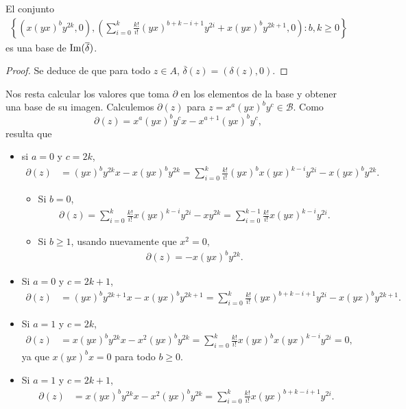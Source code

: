 \documentclass[fleqn,../tesis.tex]{subfiles}
\begin{document}
\begin{prop}
El conjunto
\begin{align*}
		\left\{ \left(x(yx)^by^{2k}, 0\right),
			\left(\sum_{i = 0}^k\frac{k!}{i!}(yx)^{b + k - i + 1}y^{2i} + x(yx)^by^{2k + 1},0\right) :b, k \geq 0 \right\}
\end{align*}
es una base de $\operatorname{Im}(\overline{\delta})$.
\end{prop}
\begin{proof}
	Se deduce de que para todo $z \in A$, $\overline{\delta}(z) = (\delta(z), 0)$.
\end{proof}

Nos resta calcular los valores que toma $\partial$ en los elementos de la base y obtener una base de su imagen.
Calculemos $\partial(z)$ para $z = x^a(yx)^by^c \in \mathcal{B}$. Como
\[
	\partial(z) = x^a(yx)^by^cx - x^{a + 1}(yx)^by^c,
\]
resulta que
\begin{itemize}
	\item si $a = 0$ y $c = 2k$,
		\begin{align*}
			\partial(z) &= (yx)^by^{2k}x - x(yx)^by^{2k}
				= \sum_{i = 0}^k\frac{k!}{i!}(yx)^bx(yx)^{k - i}y^{2i} - x(yx)^by^{2k}.
		\end{align*}
		\begin{itemize}
			\item Si $b = 0$,
			\begin{align*}
				\partial(z) = \sum_{i = 0}^k\frac{k!}{i!}x(yx)^{k - i}y^{2i} - xy^{2k}
					= \sum_{i = 0}^{k - 1}\frac{k!}{i!}x(yx)^{k - i}y^{2i}.
			\end{align*}
			\item Si $b \geq 1$, usando nuevamente que $x^2 = 0,$
			\begin{align*}
				\partial(z) = -x(yx)^by^{2k}.
			\end{align*}
		\end{itemize}
		\item Si $a = 0$ y $c = 2k + 1$,
	\begin{align*}
		\partial(z) &= (yx)^by^{2k + 1}x - x(yx)^by^{2k + 1}
			= \sum_{i = 0}^k\frac{k!}{i!}(yx)^{b + k - i + 1}y^{2i} - x(yx)^by^{2k + 1}.
	\end{align*}
\item Si $a = 1$ y  $c = 2k$,
	\begin{align*}
		\partial(z) &= x(yx)^by^{2k}x - x^2(yx)^by^{2k} 
			= \sum_{i = 0}^k\frac{k!}{i!}x(yx)^bx(yx)^{k - i}y^{2i} = 0,
	\end{align*}
ya que 	$x(yx)^bx = 0$ para todo $b \geq 0$.
\item Si $a = 1$ y  $c = 2k + 1$,
	\begin{align*}
		\partial(z) &= x(yx)^by^{2k}x - x^2(yx)^by^{2k} = \sum_{i = 0}^k\frac{k!}{i!}x(yx)^{b + k - i + 1}y^{2i}.
	\end{align*}
\end{itemize}
\end{document}
